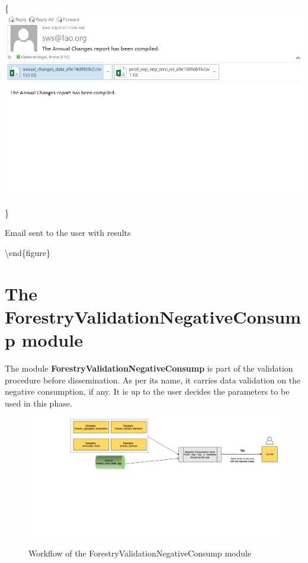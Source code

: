 \documentclass[
]{book}
\begin{document}
\{\centering \includegraphics[width=0.8\linewidth]{images/annual_changes_email_sent}

\}

\caption{Email sent to the user with results}

\label{fig:AnnualChangesPluginEmail}
\textbackslash end\{figure\}

\hypertarget{ForestryValidationNegativeConsump}{%
\chapter{\texorpdfstring{\textbf{The ForestryValidationNegativeConsump module}}{The ForestryValidationNegativeConsump module}}\label{ForestryValidationNegativeConsump}}

The module \textbf{ForestryValidationNegativeConsump} is part of the validation procedure before dissemination. As per its name, it carries data validation on the negative consumption, if any. It is up to the user decides the parameters to be used in this phase.

\begin{figure}

{\centering \includegraphics[width=0.85\linewidth]{images/ForestryValidationNegativeConsump} 

}

\caption{Workflow of the ForestryValidationNegativeConsump module}\label{fig:ForestryValidationNegativeConsumpWorkflow}
\end{figure}
\end{document}
